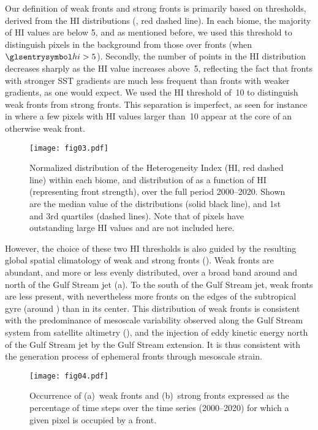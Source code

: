 Our definition of weak fronts and strong fronts is primarily based on thresholds, derived from the HI distributions (, red dashed line).
In each biome, the majority of HI values are below 5, and as mentioned before, we used this threshold to distinguish pixels in the background from those over fronts (when \(\am{hi} > 5\)).
Secondly, the number of points in the HI distribution decreases sharply as the HI value increases above~5, reflecting the fact that fronts with stronger SST gradients are much less frequent than fronts with weaker gradients, as one would expect.
We used the HI threshold of~10 to distinguish weak fronts from strong fronts.
This separation is imperfect, as seen for instance in  where a few pixels with HI values larger than~10 appear at the core of an otherwise weak front.

\begin{figure*}
  \centering
  \texttt{[image: fig03.pdf]}
  \caption[Distribution of Chl-\textit{a} against HI]{
    Normalized distribution of the Heterogeneity Index (HI, red dashed line) within each biome, and distribution of  as a function of HI (representing front strength), over the full period 2000--2020.
    Shown are the median value of the  distributions (solid black line), and 1st and 3rd quartiles (dashed lines).
    Note that  of pixels have outstanding large HI values and are not included here.
  }%
  \label{fig:chl-vs-hi}
\end{figure*}

However, the choice of these two HI thresholds is also guided by the resulting global spatial climatology of weak and strong fronts ().
Weak fronts are abundant, and more or less evenly distributed, over a broad band around and north of the Gulf Stream jet (a).
To the south of the Gulf Stream jet, weak fronts are less present, with nevertheless more fronts on the edges of the subtropical gyre (around ) than in its center.
This distribution of weak fronts is consistent with the predominance of mesoscale variability observed along the Gulf Stream system from satellite altimetry (\cite{zhai_2008}), and the injection of eddy kinetic energy north of the Gulf Stream jet by the Gulf Stream extension.
It is thus consistent with the generation process of ephemeral fronts through mesoscale strain.

\begin{figure*}
  \centering
  \texttt{[image: fig04.pdf]}
  \caption[Occurrence map of strong and weak fronts]{
    Occurrence of (a)~weak fronts and (b)~strong fronts expressed as the percentage of time steps over the time series (2000--2020) for which a given pixel is occupied by a front.
  }%
  \label{fig:frt-occurrence}
\end{figure*}

